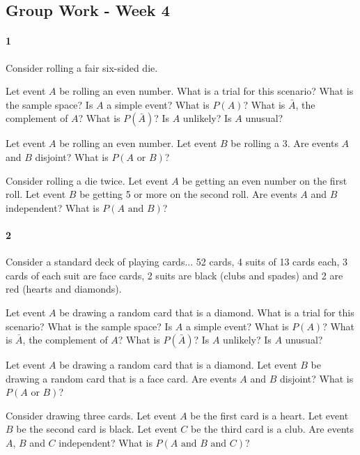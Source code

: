 \documentclass{article}
\begin{document}
\begin{flushleft}
\section*{Group Work - Week 4}
\paragraph{1} Consider rolling a fair six-sided die.
\begin{enumalpha}
\item Let event $A$ be rolling an even number. What is a trial for this scenario? What is the sample space? Is $A$ a simple event? What is $P(A)$? What is $\bar A$, the complement of $A$? What is $P(\bar A)$? Is $A$ unlikely? Is $A$ unusual?
\vspace{2.5in}
\item Let event $A$ be rolling an even number. Let event $B$ be rolling a 3. Are events $A$ and $B$ disjoint? What is $P(A \text{ or } B)$?
\vspace{2.5in}
\item Consider rolling a die twice. Let event $A$ be getting an even number on the first roll. Let event $B$ be getting 5 or more on the second roll. Are events $A$ and $B$ independent? What is $P(A \text { and } B)$?
\end{enumalpha}

\newpage
\paragraph{2} Consider a standard deck of playing cards... 52 cards, 4 suits of 13 cards each, 3 cards of each suit are face cards, 2 suits are black (clubs and spades) and 2 are red (hearts and diamonds).
\begin{enumalpha}
\item Let event $A$ be drawing a random card that is a diamond. What is a trial for this scenario? What is the sample space? Is $A$ a simple event? What is $P(A)$? What is $\bar A$, the complement of $A$? What is $P(\bar A)$? Is $A$ unlikely? Is $A$ unusual?
\vspace{2.5in}
\item Let event $A$ be drawing a random card that is a diamond. Let event $B$ be drawing a random card that is a face card. Are events $A$ and $B$ disjoint? What is $P(A \text{ or } B)$?
\vspace{2.5in}
\item Consider drawing three cards. Let event $A$ be the first card is a heart. Let event $B$ be the second card is black. Let event $C$ be the third card is a club. Are events $A$, $B$ and $C$ independent? What is $P(A \text { and } B \text { and } C)$?


\end{enumalpha}
\end{flushleft}
\end{document}
